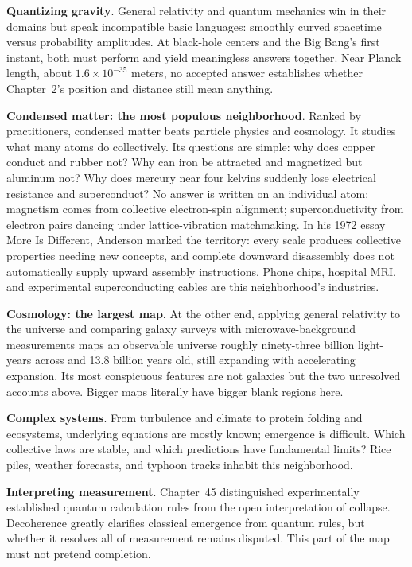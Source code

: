 \textbf{Quantizing gravity}. General relativity and quantum mechanics win in their domains but speak incompatible basic languages: smoothly curved spacetime versus probability amplitudes. At black-hole centers and the Big Bang's first instant, both must perform and yield meaningless answers together. Near Planck length, about $1.6\times10^{-35}$ meters, no accepted answer establishes whether Chapter~2's position and distance still mean anything.

\textbf{Condensed matter: the most populous neighborhood}. Ranked by practitioners, condensed matter beats particle physics and cosmology. It studies what many atoms do collectively. Its questions are simple: why does copper conduct and rubber not? Why can iron be attracted and magnetized but aluminum not? Why does mercury near four kelvins suddenly lose electrical resistance and superconduct? No answer is written on an individual atom: magnetism comes from collective electron-spin alignment; superconductivity from electron pairs dancing under lattice-vibration matchmaking. In his 1972 essay More Is Different, Anderson marked the territory: every scale produces collective properties needing new concepts, and complete downward disassembly does not automatically supply upward assembly instructions. Phone chips, hospital MRI, and experimental superconducting cables are this neighborhood's industries.

\textbf{Cosmology: the largest map}. At the other end, applying general relativity to the universe and comparing galaxy surveys with microwave-background measurements maps an observable universe roughly ninety-three billion light-years across and 13.8 billion years old, still expanding with accelerating expansion. Its most conspicuous features are not galaxies but the two unresolved accounts above. Bigger maps literally have bigger blank regions here.

\textbf{Complex systems}. From turbulence and climate to protein folding and ecosystems, underlying equations are mostly known; emergence is difficult. Which collective laws are stable, and which predictions have fundamental limits? Rice piles, weather forecasts, and typhoon tracks inhabit this neighborhood.

\textbf{Interpreting measurement}. Chapter~45 distinguished experimentally established quantum calculation rules from the open interpretation of collapse. Decoherence greatly clarifies classical emergence from quantum rules, but whether it resolves all of measurement remains disputed. This part of the map must not pretend completion.


